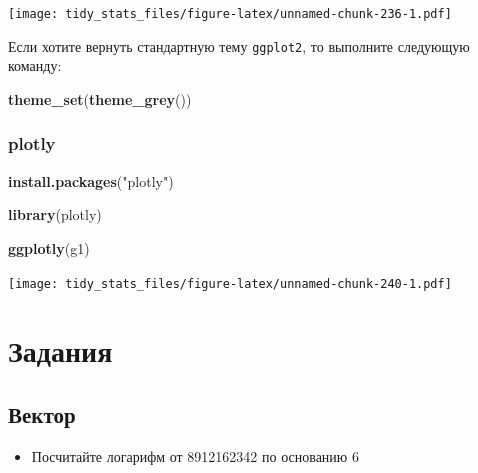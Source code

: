 \documentclass[]{book}
\newenvironment{Shaded}{\begin{snugshade}}{\end{snugshade}}
\newcommand{\KeywordTok}[1]{\textcolor[rgb]{0.13,0.29,0.53}{\textbf{#1}}}
\newcommand{\StringTok}[1]{\textcolor[rgb]{0.31,0.60,0.02}{#1}}
\newcommand{\NormalTok}[1]{#1}
\providecommand{\tightlist}{%
  \setlength{\itemsep}{0pt}\setlength{\parskip}{0pt}}
\begin{document}
\texttt{[image: tidy\_stats\_files/figure-latex/unnamed-chunk-236-1.pdf]}

Если хотите вернуть стандартную тему \texttt{ggplot2}, то выполните
следующую команду:

\begin{Shaded}
\begin{Highlighting}[]
\KeywordTok{theme_set}\NormalTok{(}\KeywordTok{theme_grey}\NormalTok{())}
\end{Highlighting}
\end{Shaded}

\subsection{plotly}\label{plotly}

\begin{Shaded}
\begin{Highlighting}[]
\KeywordTok{install.packages}\NormalTok{(}\StringTok{"plotly"}\NormalTok{)}
\end{Highlighting}
\end{Shaded}

\begin{Shaded}
\begin{Highlighting}[]
\KeywordTok{library}\NormalTok{(plotly)}
\end{Highlighting}
\end{Shaded}

\begin{Shaded}
\begin{Highlighting}[]
\KeywordTok{ggplotly}\NormalTok{(g1)}
\end{Highlighting}
\end{Shaded}

\texttt{[image: tidy\_stats\_files/figure-latex/unnamed-chunk-240-1.pdf]}

\chapter{Задания}\label{tasks}

\section{Вектор}\label{vec_task_1}

\begin{itemize}
\tightlist
\item
  Посчитайте логарифм от 8912162342 по основанию 6
\end{itemize}
\end{document}
